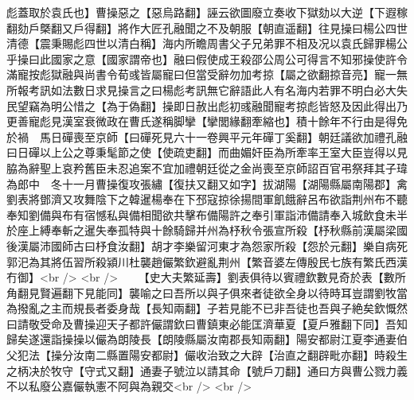 彪蓋取於袁氏也】曹操惡之【惡烏路翻】誣云欲圖廢立奏收下獄劾以大逆【下遐稼翻劾戶槩翻又戶得翻】將作大匠孔融聞之不及朝服【朝直遥翻】往見操曰楊公四世清德【震秉賜彪四世以清白稱】海内所瞻周書父子兄弟罪不相及况以袁氏歸罪楊公乎操曰此國家之意【國家謂帝也】融曰假使成王殺邵公周公可得言不知邪操使許令滿寵按彪獄融與尚書令荀彧皆屬寵曰但當受辭勿加考掠【屬之欲翻掠音亮】寵一無所報考訊如法數日求見操言之曰楊彪考訊無它辭語此人有名海内若罪不明白必大失民望竊為明公惜之【為于偽翻】操即日赦出彪初彧融聞寵考掠彪皆怒及因此得出乃更善寵彪見漢室衰微政在曹氏遂稱脚攣【攣閭緣翻牽縮也】積十餘年不行由是得免於禍　馬日磾喪至京師【曰磾死見六十一卷興平元年磾丁奚翻】朝廷議欲加禮孔融曰日磾以上公之尊秉髦節之使【使疏吏翻】而曲媚奸臣為所牽率王室大臣豈得以見脇為辭聖上哀矜舊臣未忍追案不宜加禮朝廷從之金尚喪至京師詔百官弔祭拜其子瑋為郎中　冬十一月曹操復攻張繡【復扶又翻又如字】拔湖陽【湖陽縣屬南陽郡】禽劉表將鄧濟又攻舞陰下之韓暹楊奉在下邳寇掠徐揚間軍飢餓辭呂布欲詣荆州布不聽奉知劉備與布有宿憾私與備相聞欲共擊布備陽許之奉引軍詣沛備請奉入城飲食未半於座上縛奉斬之暹失奉孤特與十餘騎歸并州為杼秋令張宣所殺【杼秋縣前漢屬梁國後漢屬沛國師古曰杼食汝翻】胡才李樂留河東才為怨家所殺【怨於元翻】樂自病死郭汜為其將伍習所殺潁川杜襲趙儼繁欽避亂荆州【繁音婆左傳殷民七族有繁氏西漢冇御】<br />
<br />
　　【史大夫繁延壽】劉表俱待以賓禮欽數見奇於表【數所角翻見賢遍翻下見能同】襲喻之曰吾所以與子俱來者徒欲全身以待時耳豈謂劉牧當為撥亂之主而規長者委身哉【長知兩翻】子若見能不已非吾徒也吾與子絶矣欽慨然曰請敬受命及曹操迎天子都許儼謂欽曰曹鎮東必能匡濟華夏【夏戶雅翻下同】吾知歸矣遂還詣操操以儼為朗陵長【朗陵縣屬汝南郡長知兩翻】陽安都尉江夏李通妻伯父犯法【操分汝南二縣置陽安都尉】儼收治致之大辟【治直之翻辟毗亦翻】時殺生之柄决於牧守【守式又翻】通妻子號泣以請其命【號戶刀翻】通曰方與曹公戮力義不以私廢公嘉儼執憲不阿與為親交<br />
<br />
